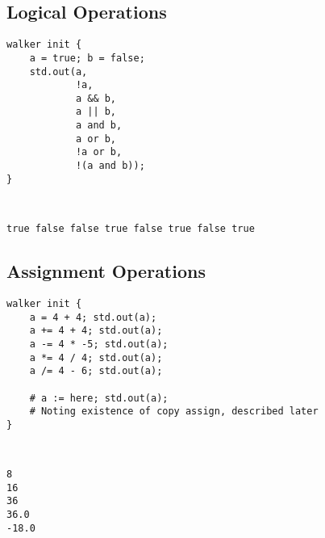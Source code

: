 \subsection*{Logical Operations}
\begin{description}
    \begin{lstlisting}[caption={Logical operations}]
walker init {
    a = true; b = false;
    std.out(a,
            !a,
            a && b,
            a || b,
            a and b,
            a or b,
            !a or b,
            !(a and b));
}
    \end{lstlisting}
    \item[Output] \texttt{ }
          \begin{lstlisting}[language=shell]
true false false true false true false true
        \end{lstlisting}
    \item[Description] \texttt{}
\end{description}


\subsection*{Assignment Operations}
\begin{description}
    \begin{lstlisting}[caption={Assignment operations}]
walker init {
    a = 4 + 4; std.out(a);
    a += 4 + 4; std.out(a);
    a -= 4 * -5; std.out(a);
    a *= 4 / 4; std.out(a);
    a /= 4 - 6; std.out(a);

    # a := here; std.out(a);
    # Noting existence of copy assign, described later
}
    \end{lstlisting}
    \item[Output] \texttt{ }
          \begin{lstlisting}[language=shell]
8
16
36
36.0
-18.0
        \end{lstlisting}
    \item[Description] \texttt{}
\end{description}


